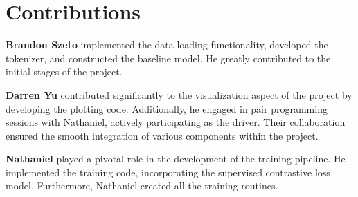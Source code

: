 \section*{Contributions}

\label{sec:contributions}

\noindent\textbf{Brandon Szeto} implemented the data loading functionality, developed the tokenizer, and constructed the baseline model. He greatly contributed to the initial stages of the project.

\noindent\textbf{Darren Yu} contributed significantly to the visualization aspect of the project by developing the plotting code. Additionally, he engaged in pair programming sessions with Nathaniel, actively participating as the driver. Their collaboration ensured the smooth integration of various components within the project.

\noindent\textbf{Nathaniel} played a pivotal role in the development of the training pipeline. He implemented the training code, incorporating the supervised contrastive loss model. Furthermore, Nathaniel created all the training routines.

